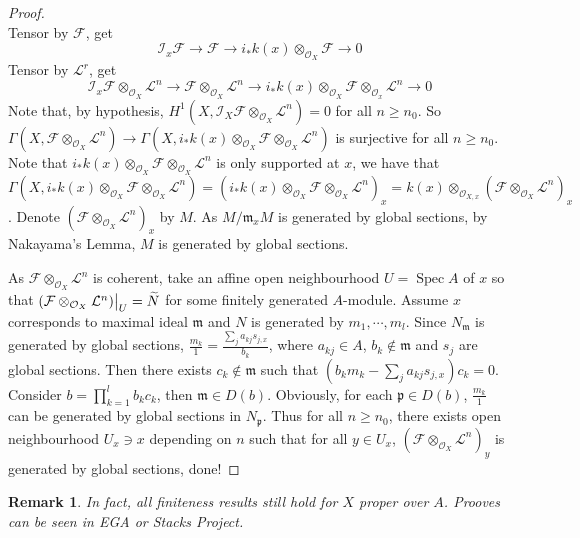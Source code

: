 \documentclass{ctexart}
\newtheorem{remark}{Remark}[section]
\newcommand{\spec}{\operatorname{Spec}}
\begin{document}
\begin{proof}
\begin{equation*}
    \end{equation*}
    Tensor by $\mathcal{F}$, get
    \begin{equation*}
        \mathcal{I}_{x}\mathcal{F} \longrightarrow \mathcal{F} \longrightarrow i_{\ast}k(x) \otimes_{\mathcal{O}_{X}} \mathcal{F} \longrightarrow 0
    \end{equation*}
    Tensor by $\mathcal{L}^{r}$, get
    \begin{equation*}
        \mathcal{I}_{x}\mathcal{F} \otimes_{\mathcal{O}_{X}} \mathcal{L}^{n} \longrightarrow \mathcal{F} \otimes_{\mathcal{O}_{X}} \mathcal{L}^{n} \longrightarrow i_{\ast}k(x) \otimes_{\mathcal{O}_{X}} \mathcal{F} \otimes_{\mathcal{O}_{x}} \mathcal{L}^{n}\longrightarrow 0
    \end{equation*}
    Note that, by hypothesis, $H^{1}(X, \mathcal{I}_{X}\mathcal{F} \otimes_{\mathcal{O}_{X}} \mathcal{L}^{n}) = 0$ for all $n \ge n_{0}$.
    So $\Gamma(X, \mathcal{F} \otimes_{\mathcal{O}_{X}} \mathcal{L}^{n}) \longrightarrow \Gamma(X, i_{\ast}k(x) \otimes_{\mathcal{O}_{X}} \mathcal{F} \otimes_{\mathcal{O}_{X}} \mathcal{L}^{n})$ is surjective for all $n \ge n_{0}$.
    Note that $i_{\ast}k(x) \otimes_{\mathcal{O}_{X}} \mathcal{F} \otimes_{\mathcal{O}_{X}} \mathcal{L}^{n}$ is only supported at $x$,
    we have that $\Gamma(X, i_{\ast}k(x) \otimes_{\mathcal{O}_{X}} \mathcal{F} \otimes_{\mathcal{O}_{X}} \mathcal{L}^{n}) = (i_{\ast}k(x) \otimes_{\mathcal{O}_{X}} \mathcal{F} \otimes_{\mathcal{O}_{X}} \mathcal{L}^{n})_{x} = k(x) \otimes_{\mathcal{O}_{X, x}} (\mathcal{F} \otimes_{\mathcal{O}_{X}} \mathcal{L}^{n})_{x}$.
    Denote $(\mathcal{F} \otimes_{\mathcal{O}_{X}} \mathcal{L}^{n})_{x}$ by $M$.
    As $M/\mathfrak{m}_{x}M$ is generated by global sections, by Nakayama's Lemma, $M$ is generated by global sections.
    \par
    As $\mathcal{F} \otimes_{\mathcal{O}_{X}} \mathcal{L}^{n}$ is coherent,
    take an affine open neighbourhood $U = \spec A$ of $x$ so that $(\mathcal{F} \otimes_{\mathcal{O}_{X}} \mathcal{L}^{n})\big{|}_{U} = \widetilde{N}$ for some finitely generated $A$-module.
    Assume $x$ corresponds to maximal ideal $\mathfrak{m}$ and $N$ is generated by $m_{1}, \cdots, m_{l}$.
    Since $N_{\mathfrak{m}}$ is generated by global sections, $\frac{m_{k}}{1} = \frac{\sum_{j} a_{kj}s_{j, x}}{b_{k}}$,
    where $a_{kj}\in A$, $b_{k}\notin \mathfrak{m}$ and $s_{j}$ are global sections.
    Then there exists $c_{k}\notin \mathfrak{m}$ such that $(b_{k}m_{k} - \sum_{j} a_{kj}s_{j, x})c_{k} = 0$.
    Consider $b = \prod_{k = 1}^{l} b_{k}c_{k}$, then $\mathfrak{m}\in D(b)$.
    Obviously, for each $\mathfrak{p}\in D(b)$, $\frac{m_{k}}{1}$ can be generated by global sections in $N_{\mathfrak{p}}$.
    Thus for all $n \ge n_{0}$, there exists open neighbourhood $U_{x}\ni x$ depending on $n$ such that for all $y\in U_{x}$,
    $(\mathcal{F} \otimes_{\mathcal{O}_{X}} \mathcal{L}^{n})_{y}$ is generated by global sections, done!
\end{proof}
\begin{remark}
    In fact, all finiteness results still hold for $X$ proper over $A$.
    Prooves can be seen in EGA or Stacks Project.
\end{remark}
\end{document}
